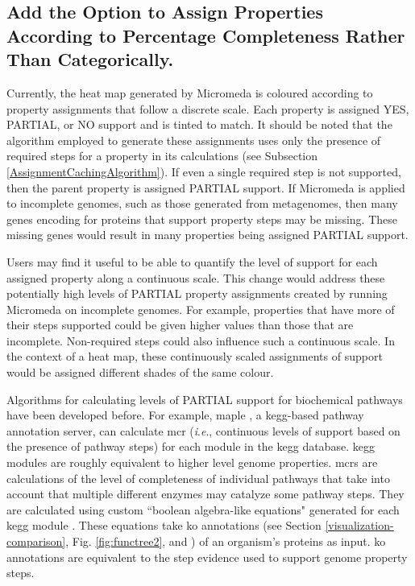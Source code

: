 \subsection{Add the Option to Assign Properties According to Percentage 
Completeness Rather Than Categorically.}

Currently, the heat map generated by Micromeda is coloured according to property 
assignments that follow a discrete scale. Each property is assigned YES, 
PARTIAL, or NO support and is tinted to match. It should be noted that the 
algorithm employed to generate these assignments uses only the presence of 
required steps for a property in its calculations (see Subsection 
\ref{AssignmentCachingAlgorithm}). If even a single required step is not 
supported, then the parent property is assigned PARTIAL support. If Micromeda is 
applied to incomplete genomes, such as those generated from metagenomes, then 
many genes encoding for proteins that support property steps may be missing. 
These missing genes would result in many properties being assigned PARTIAL 
support. 

Users may find it useful to be able to quantify the level of support for each 
assigned property along a continuous scale. This change would address these 
potentially high levels of PARTIAL property assignments created by running 
Micromeda on incomplete genomes. For example, properties that have more of their 
steps supported could be given higher values than those that are incomplete. 
Non-required steps could also influence such a continuous scale. In the context 
of a heat map, these continuously scaled assignments of support would be 
assigned different shades of the same colour.

Algorithms for calculating levels of PARTIAL support for biochemical pathways 
have been developed before. For example, \gls{maple} \cite{takami2016automated}, 
a \gls{kegg}-based pathway annotation server, can calculate \gls{mcr} (\textit{i}.\textit{e}., 
continuous levels of support based on the presence of pathway steps) for each 
module in the \gls{kegg}  database. \gls{kegg} modules are roughly equivalent to 
higher level genome properties. \gls{mcr}s are calculations of the level of 
completeness of individual pathways that take into account that multiple 
different enzymes may catalyze some pathway steps. They are calculated using 
custom ``boolean algebra-like equations" generated for each \gls{kegg} module 
\cite{takami2012evaluation}. These equations take \gls{ko} annotations (see 
Section \ref{visualization-comparison}, Fig. \ref{fig:functree2}, and 
\cite{mao2005automated}) of an organism's proteins as input. \gls{ko} 
annotations are equivalent to the step evidence used to support genome property 
steps. 

